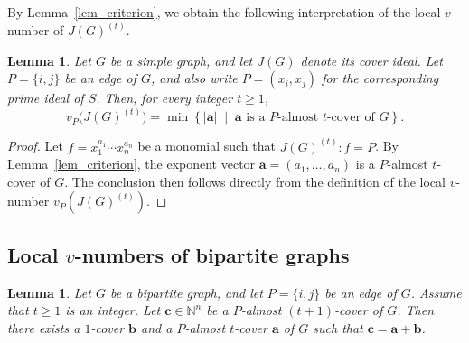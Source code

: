 \documentclass[12pt,amscd]{amsart}
\newtheorem{lem}[thm]{Lemma}
\theoremstyle{definition}
\numberwithin{equation}{section}
\begin{document}
By Lemma~\ref{lem_criterion}, we obtain the following interpretation of the
local $v$-number of $J(G)^{(t)}$.

\begin{lem}\label{lem_int_prog}
Let $G$ be a simple graph, and let $J(G)$ denote its cover ideal. Let
$P=\{i,j\}$ be an edge of $G$, and also write $P=(x_i,x_j)$ for the
corresponding prime ideal of $S$. Then, for every integer $t\ge1$,
\[
v_P\bigl(J(G)^{(t)}\bigr)
=
\min\left\{
|\mathbf{a}|
\;\middle|\;
\mathbf{a}\text{ is a $P$-almost $t$-cover of $G$}
\right\}.
\]
\end{lem}
\begin{proof}
Let $f = x_1^{a_1}\cdots x_n^{a_n}$ be a monomial such that $J(G)^{(t)} : f = P$. By Lemma~\ref{lem_criterion}, the exponent vector $\mathbf{a} = (a_1, \ldots, a_n)$ is a $P$-almost $t$-cover of $G$. The conclusion then follows directly from the definition of the local $v$-number $v_P(J(G)^{(t)})$.
\end{proof}




\subsection{Local $v$-numbers of bipartite graphs}



\begin{lem}\label{lem_decomp1} 
Let $G$ be a bipartite graph, and let $P = \{i,j\}$ be an edge of $G$. Assume that $t \ge 1$ is an integer. Let $\mathbf{c} \in \mathbb{N}^n$ be a $P$-almost $(t+1)$-cover of $G$. Then there exists a $1$-cover $\mathbf{b}$ and a $P$-almost $t$-cover $\mathbf{a}$ of $G$ such that $\mathbf{c} = \mathbf{a} + \mathbf{b}$.
\end{lem}
\end{document}
